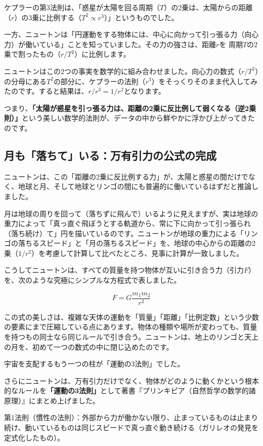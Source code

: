 ケプラーの第3法則は、「惑星が太陽を回る周期（\(T\)）の2乗は、太陽からの距離（\(r\)）の3乗に比例する（\(T^2 \propto r^3\)）」というものでした。

一方、ニュートンは「円運動をする物体には、中心に向かって引っ張る力（向心力）が働いている」ことを知っていました。その力の強さは、距離\(r\)を 周期\(T\)の2乗で割ったもの（\(r/T^2\)）に比例します。

ニュートンはこの2つの事実を数学的に組み合わせました。向心力の数式（\(r/T^2\)）の分母にある\(T^2\)の部分に、ケプラーの法則（\(r^3\)）をそっくりそのまま代入してみたのです。すると結果は、\(r/r^3 = 1/r^2\)となります。

つまり、\textbf{「太陽が惑星を引っ張る力は、距離の2乗に反比例して弱くなる（逆2乗則）」}という美しい数学的法則が、データの中から鮮やかに浮かび上がってきたのです。

\subsection{月も「落ちて」いる：万有引力の公式の完成}

ニュートンは、この「距離の2乗に反比例する力」が、太陽と惑星の間だけでなく、地球と月、そして地球とリンゴの間にも普遍的に働いているはずだと推論しました。

月は地球の周りを回って（落ちずに飛んで）いるように見えますが、実は地球の重力によって「真っ直ぐ飛ぼうとする軌道から、常に下に向かって引っ張られ（落ち続け）て」円を描いているのです。ニュートンが地球の重力による「リンゴの落ちるスピード」と「月の落ちるスピード」を、地球の中心からの距離の2乗（\(1/r^2\)）を考慮して計算して比べたところ、見事に計算が一致しました。

こうしてニュートンは、すべての質量を持つ物体が互いに引き合う力（引力\(F\)）を、次のような究極にシンプルな方程式で表しました。

\[
F=G\frac{m_1m_2}{r^2}
\]

この式の美しさは、複雑な天体の運動を「質量」「距離」「比例定数」という少数の要素にまで圧縮している点にあります。物体の種類や場所が変わっても、質量を持つもの同士なら同じルールで引き合う。ニュートンは、地上のリンゴと天上の月を、初めて一つの数式の中に閉じ込めたのです。

宇宙を支配するもう一つの柱が「運動の3法則」でした。

さらにニュートンは、万有引力だけでなく、物体がどのように動くかという根本的なルールを\textbf{「運動の3法則」}として著書『プリンキピア（自然哲学の数学的諸原理）』にまとめ上げました。

第1法則（慣性の法則）：外部から力が働かない限り、止まっているものは止まり続け、動いているものは同じスピードで真っ直ぐ動き続ける（ガリレオの発見を定式化したもの）。

